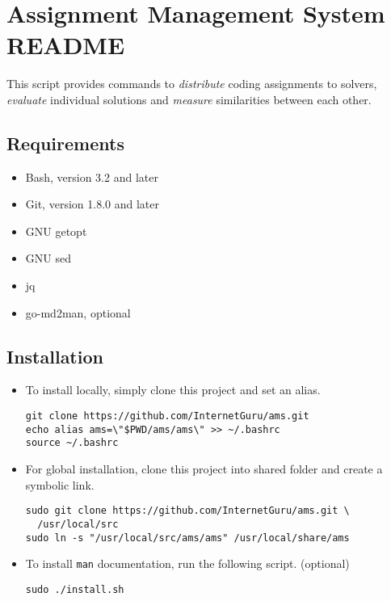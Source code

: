 \chapter{Assignment Management System README}\label{assignment-management-system-readme}

This script provides commands to \emph{distribute} coding assignments to solvers, \emph{evaluate} individual solutions and \emph{measure} similarities between each other.

\section{Requirements}\label{requirements}

\begin{itemize}
\item
  Bash, version 3.2 and later
\item
  Git, version 1.8.0 and later
\item
  GNU getopt
\item
  GNU sed
\item
  jq
\item
  go-md2man, optional
\end{itemize}

\section{Installation}\label{installation}

\begin{itemize}
\item
  To install locally, simply clone this project and set an alias.

\begin{verbatim}
git clone https://github.com/InternetGuru/ams.git
echo alias ams=\"$PWD/ams/ams\" >> ~/.bashrc
source ~/.bashrc
\end{verbatim}

\item
  For global installation, clone this project into shared folder and create a symbolic link.

\begin{verbatim}
sudo git clone https://github.com/InternetGuru/ams.git \
  /usr/local/src
sudo ln -s "/usr/local/src/ams/ams" /usr/local/share/ams
\end{verbatim}

\item
  To install \texttt{man} documentation, run the following script. (optional)

\begin{verbatim}
sudo ./install.sh
\end{verbatim}

\end{itemize}

